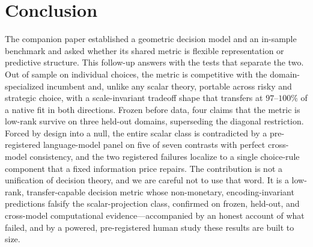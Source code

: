 \documentclass[journal]{IEEEtran}
\begin{document}
\section{Conclusion}
\label{sec:conclusion}

The companion paper established a geometric decision model and an in-sample benchmark and asked whether its shared metric is flexible representation or predictive structure.
This follow-up answers with the tests that separate the two.
Out of sample on individual choices, the metric is competitive with the domain-specialized incumbent and, unlike any scalar theory, portable across risky and strategic choice, with a scale-invariant tradeoff shape that transfers at $97$--$100\%$ of a native fit in both directions.
Frozen before data, four claims that the metric is low-rank survive on three held-out domains, superseding the diagonal restriction.
Forced by design into a null, the entire scalar class is contradicted by a pre-registered language-model panel on five of seven contrasts with perfect cross-model consistency, and the two registered failures localize to a single choice-rule component that a fixed information price repairs.
The contribution is not a unification of decision theory, and we are careful not to use that word.
It is a low-rank, transfer-capable decision metric whose non-monetary, encoding-invariant predictions falsify the scalar-projection class, confirmed on frozen, held-out, and cross-model computational evidence---accompanied by an honest account of what failed, and by a powered, pre-registered human study these results are built to size.
\end{document}
